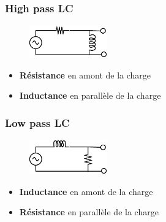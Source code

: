 \documentclass[a4paper]{article}
\begin{document}
    \subsubsection{High pass LC}
    \begin{figure}[H]
        \begin{center}
            \includegraphics[width=0.3\textwidth]{fig/2_lcHP.eps}
        \end{center}
    \end{figure}
    \begin{itemize}
        \item \textbf{Résistance} en amont de la charge
        \item \textbf{Inductance} en parallèle de la charge
    \end{itemize}

    \subsubsection{Low pass LC}
    \begin{figure}[H]
        \begin{center}
            \includegraphics[width=0.3\textwidth]{fig/2_lcLP.eps}
        \end{center}
    \end{figure}
    \begin{itemize}
        \item \textbf{Inductance} en amont de la charge
        \item \textbf{Résistance} en parallèle de la charge
    \end{itemize}
\end{document}
